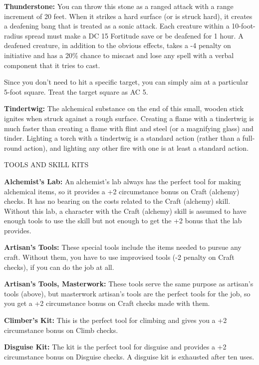 \documentclass{article}
\begin{document}
\textbf{Thunderstone:} You can throw this stone as a ranged attack with a range 
increment of 20 feet. When it strikes a hard surface (or is struck hard), it creates 
a deafening bang that is treated as a sonic attack. Each creature within a 10-foot-radius 
spread must make a DC 15 Fortitude save or be deafened for 1 hour. A deafened creature, 
in addition to the obvious effects, takes a -4 penalty on initiative and has a 
20\% chance to miscast and lose any spell with a verbal component that it tries 
to cast.

Since you don't need to hit a specific target, you can simply aim at a particular 
5-foot square. Treat the target square as AC 5.

\textbf{Tindertwig:} The alchemical substance on the end of this small, wooden 
stick ignites when struck against a rough surface. Creating a flame with a tindertwig 
is much faster than creating a flame with flint and steel (or a magnifying glass) 
and tinder. Lighting a torch with a tindertwig is a standard action (rather than 
a full-round action), and lighting any other fire with one is at least a standard 
action.

\vspace{12pt}
TOOLS AND SKILL KITS

\textbf{Alchemist's Lab:} An alchemist's lab always has the perfect tool for making 
alchemical items, so it provides a +2 circumstance bonus on Craft (alchemy) checks. 
It has no bearing on the costs related to the Craft (alchemy) skill. Without this 
lab, a character with the Craft (alchemy) skill is assumed to have enough tools 
to use the skill but not enough to get the +2 bonus that the lab provides.

\textbf{Artisan's Tools:} These special tools include the items needed to pursue 
any craft. Without them, you have to use improvised tools (-2 penalty on Craft 
checks), if you can do the job at all.

\textbf{Artisan's Tools, Masterwork:} These tools serve the same purpose as artisan's 
tools (above), but masterwork artisan's tools are the perfect tools for the job, 
so you get a +2 circumstance bonus on Craft checks made with them.

\textbf{Climber's Kit:} This is the perfect tool for climbing and gives you a +2 
circumstance bonus on Climb checks.

\textbf{Disguise Kit:} The kit is the perfect tool for disguise and provides a 
+2 circumstance bonus on Disguise checks. A disguise kit is exhausted after ten 
uses.
\end{document}
